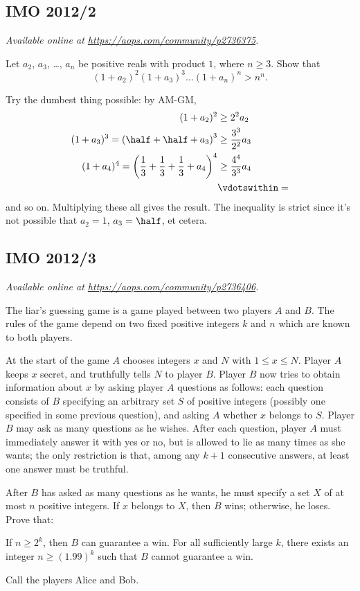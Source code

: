 \documentclass[11pt]{scrartcl}
\begin{document}
\subsection{IMO 2012/2}
\textsl{Available online at \url{https://aops.com/community/p2736375}.}
\begin{mdframed}[style=mdpurplebox,frametitle={Problem statement}]
Let $a_2$, $a_3$, \dots, $a_n$ be positive reals with product $1$,
where $n \ge 3$.
Show that
\[ (1+a_2)^2 (1+a_3)^3 \dots (1+a_n)^n > n^n. \]
\end{mdframed}
Try the dumbest thing possible: by AM-GM,
\begin{align*}
  (1 + a_2)^2 &\ge 2^2 a_2 \\
  (1 + a_3)^3 = \left( \half + \half + a_3 \right)^3 &\ge \frac{3^3}{2^2} a_3 \\
  (1 + a_4)^4 = \left( \frac13 + \frac13 + \frac13 + a_4 \right)^4
    &\ge \frac{4^4}{3^3} a_4 \\
  &\vdotswithin=
\end{align*}
and so on.
Multiplying these all gives the result.
The inequality is strict since it's not possible
that $a_2 = 1$, $a_3 = \half$, et cetera.
\pagebreak

\subsection{IMO 2012/3}
\textsl{Available online at \url{https://aops.com/community/p2736406}.}
\begin{mdframed}[style=mdpurplebox,frametitle={Problem statement}]
The liar's guessing game is a game played between two players $A$ and $B$.
The rules of the game depend on two fixed positive integers $k$ and $n$
which are known to both players.

At the start of the game $A$
chooses integers $x$ and $N$ with $1 \le x \le N$.
Player $A$ keeps $x$ secret, and truthfully tells $N$ to player $B$.
Player $B$ now tries to obtain information about $x$
by asking player $A$ questions as follows:
each question consists of $B$ specifying an arbitrary set $S$
of positive integers (possibly one specified in some previous question),
and asking $A$ whether $x$ belongs to $S$.
Player $B$ may ask as many questions as he wishes.
After each question, player $A$ must immediately answer
it with yes or no, but is allowed to lie as many times as she wants;
the only restriction is that, among any $k+1$ consecutive answers,
at least one answer must be truthful.

After $B$ has asked as many questions as he wants,
he must specify a set $X$ of at most $n$ positive integers.
If $x$ belongs to $X$, then $B$ wins;
otherwise, he loses.
Prove that:

\begin{enumerate}[(a)]
  \ii If $n \ge 2^k$, then $B$ can guarantee a win.
  \ii For all sufficiently large $k$,
  there exists an integer $n \ge (1.99)^k$
  such that $B$ cannot guarantee a win.
\end{enumerate}
\end{mdframed}
Call the players Alice and Bob.
\end{document}

